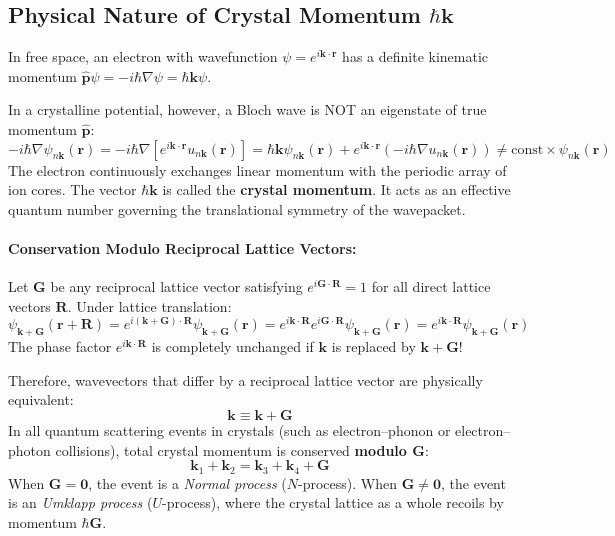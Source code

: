 \documentclass[11pt,a4paper]{article}
\newcommand{\vb}[1]{\mathbf{#1}}
\begin{document}
\subsection{Physical Nature of Crystal Momentum $\hbar\vb{k}$}
In free space, an electron with wavefunction $\psi = e^{i\vb{k}\cdot\vb{r}}$ has a definite kinematic momentum $\hat{\vb{p}}\psi = -i\hbar\nabla\psi = \hbar\vb{k}\psi$.

In a crystalline potential, however, a Bloch wave is NOT an eigenstate of true momentum $\hat{\vb{p}}$:
\begin{equation}
-i\hbar\nabla \psi_{n\vb{k}}(\vb{r}) = -i\hbar\nabla\left[ e^{i\vb{k}\cdot\vb{r}}u_{n\vb{k}}(\vb{r}) \right] = \hbar\vb{k}\psi_{n\vb{k}}(\vb{r}) + e^{i\vb{k}\cdot\vb{r}}(-i\hbar\nabla u_{n\vb{k}}(\vb{r})) \neq \text{const} \times \psi_{n\vb{k}}(\vb{r})
\end{equation}
The electron continuously exchanges linear momentum with the periodic array of ion cores. The vector $\hbar\vb{k}$ is called the \textbf{crystal momentum}. It acts as an effective quantum number governing the translational symmetry of the wavepacket.

\paragraph{Conservation Modulo Reciprocal Lattice Vectors:}
Let $\vb{G}$ be any reciprocal lattice vector satisfying $e^{i\vb{G}\cdot\vb{R}} = 1$ for all direct lattice vectors $\vb{R}$. Under lattice translation:
\begin{equation}
\psi_{\vb{k}+\vb{G}}(\vb{r}+\vb{R}) = e^{i(\vb{k}+\vb{G})\cdot\vb{R}}\psi_{\vb{k}+\vb{G}}(\vb{r}) = e^{i\vb{k}\cdot\vb{R}}e^{i\vb{G}\cdot\vb{R}}\psi_{\vb{k}+\vb{G}}(\vb{r}) = e^{i\vb{k}\cdot\vb{R}}\psi_{\vb{k}+\vb{G}}(\vb{r})
\end{equation}
The phase factor $e^{i\vb{k}\cdot\vb{R}}$ is completely unchanged if $\vb{k}$ is replaced by $\vb{k} + \vb{G}$! 

Therefore, wavevectors that differ by a reciprocal lattice vector are physically equivalent:
\begin{equation}
\boxed{\vb{k} \equiv \vb{k} + \vb{G}}
\end{equation}
In all quantum scattering events in crystals (such as electron--phonon or electron--photon collisions), total crystal momentum is conserved \textbf{modulo $\vb{G}$}:
\begin{equation}
\vb{k}_1 + \vb{k}_2 = \vb{k}_3 + \vb{k}_4 + \vb{G}
\end{equation}
When $\vb{G} = \vb{0}$, the event is a \emph{Normal process} ($N$-process). When $\vb{G} \neq \vb{0}$, the event is an \emph{Umklapp process} ($U$-process), where the crystal lattice as a whole recoils by momentum $\hbar\vb{G}$.
\end{document}
